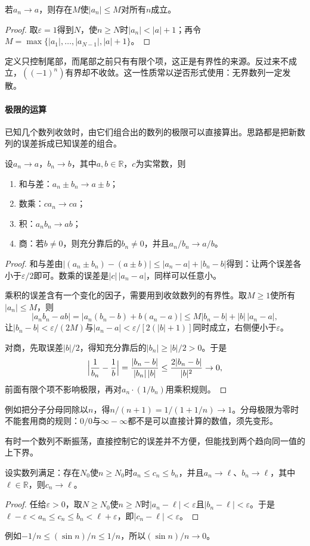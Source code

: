 \begin{theorem}[收敛数列的有界性]
\label{thm:ru-convergent-bounded}
若$a_n\to a$，则存在$M$使$|a_n|\leq M$对所有$n$成立。
\end{theorem}
\begin{proof}
取$\varepsilon=1$得到$N$，使$n\geq N$时$|a_n|<|a|+1$；再令$M=\max\{|a_1|,\ldots,|a_{N-1}|,|a|+1\}$。
\end{proof}
定义只控制尾部，而尾部之前只有有限个项，这正是有界性的来源。反过来不成立，$((-1)^n)$有界却不收敛。这一性质常以逆否形式使用：无界数列一定发散。

\paragraph{极限的运算}
已知几个数列收敛时，由它们组合出的数列的极限可以直接算出。思路都是把新数列的误差拆成已知误差的组合。
\begin{theorem}[数列极限的四则运算]
\label{thm:ru-sequence-limit-laws}
设$a_n\to a$，$b_n\to b$，其中$a,b\in\mathbb R$，$c$为实常数，则
\begin{enumerate}
 \item 和与差：$a_n\pm b_n\to a\pm b$；
 \item 数乘：$ca_n\to ca$；
 \item 积：$a_nb_n\to ab$；
 \item 商：若$b\neq0$，则充分靠后的$b_n\neq0$，并且$a_n/b_n\to a/b$。
\end{enumerate}
\end{theorem}
\begin{proof}
和与差由$|(a_n\pm b_n)-(a\pm b)|\leq|a_n-a|+|b_n-b|$得到：让两个误差各小于$\varepsilon/2$即可。数乘的误差是$|c|\,|a_n-a|$，同样可以任意小。

乘积的误差含有一个变化的因子，需要用到收敛数列的有界性。取$M\geq1$使所有$|a_n|\leq M$，则
\[
 |a_nb_n-ab|=|a_n(b_n-b)+b(a_n-a)|\leq M|b_n-b|+|b|\,|a_n-a|,
\]
让$|b_n-b|<\varepsilon/(2M)$与$|a_n-a|<\varepsilon/[2(|b|+1)]$同时成立，右侧便小于$\varepsilon$。

对商，先取误差$|b|/2$，得知充分靠后的$|b_n|\geq|b|/2>0$。于是
\[
 \Bigl|\frac1{b_n}-\frac1b\Bigr|=\frac{|b_n-b|}{|b_n|\,|b|}\leq\frac{2|b_n-b|}{|b|^2}\to0,
\]
前面有限个项不影响极限，再对$a_n\cdot(1/b_n)$用乘积规则。
\end{proof}
例如把分子分母同除以$n$，得$n/(n+1)=1/(1+1/n)\to1$。分母极限为零时不能套用商的规则：$0/0$与$\infty-\infty$都不是可以直接计算的数值，须先变形。

有时一个数列不断振荡，直接控制它的误差并不方便，但能找到两个趋向同一值的上下界。
\begin{theorem}[夹逼定理]
\label{thm:analysis-sequence-squeeze}
设实数列满足：存在$N_0$使$n\geq N_0$时$a_n\leq c_n\leq b_n$，并且$a_n\to\ell$、$b_n\to\ell$，其中$\ell\in\mathbb R$，则$c_n\to\ell$。
\end{theorem}
\begin{proof}
任给$\varepsilon>0$，取$N\geq N_0$使$n\geq N$时$|a_n-\ell|<\varepsilon$且$|b_n-\ell|<\varepsilon$。于是$\ell-\varepsilon<a_n\leq c_n\leq b_n<\ell+\varepsilon$，即$|c_n-\ell|<\varepsilon$。
\end{proof}
例如$-1/n\leq(\sin n)/n\leq1/n$，所以$(\sin n)/n\to0$。

